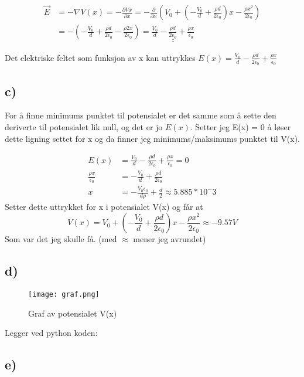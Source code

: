 \documentclass[a4paper,12pt,norsk]{article}
\begin{document}
\begin{align*}
\vec{E} &= - \nabla V(x) = -\frac{\partial Vx}{\partial x} = -\frac{\partial}{\partial x} \left(V_0 + \left( -\frac{V_0}{d} + \frac{\rho d}{2\epsilon_0} \right)x - \frac{\rho x^2}{2\epsilon_0}\right) \\
& = -\left(-\frac{V_0}{d} + \frac{\rho d}{2\epsilon_0} - \frac{\rho 2x}{2\epsilon_0}\right) 
=\underline{\underline{ \frac{V_0}{d} - \frac{\rho d}{2\epsilon_0} + \frac{\rho x}{\epsilon_0}}}
\end{align*}

Det elektriske feltet som funksjon av x kan uttrykkes $E(x) =  \frac{V_0}{d} - \frac{\rho d}{2\epsilon_0} + \frac{\rho x}{\epsilon_0}$

\subsection{c)}

For å finne minimums punktet til potensialet er det samme som å sette den deriverte til potensialet lik null, og det er jo $E(x)$. Setter jeg E(x) = 0 å løser dette ligning settet for x og da finner jeg minimums/maksimums punktet til V(x).

\begin{align*}
E(x) &=  \frac{V_0}{d} - \frac{\rho d}{2\epsilon_0} + \frac{\rho x}{\epsilon_0} = 0\\
\frac{\rho x}{\epsilon_0} &= -\frac{V_0}{d} + \frac{\rho d}{2\epsilon_0} \\
x &= -\frac{V_0\epsilon_0}{d\rho} + \frac{d}{2} \approx 5.885*10^-3
\end{align*}
Setter dette uttrykket for x i potensialet V(x) og får at $$V(x) = V_0 + \left( -\frac{V_0}{d} + \frac{\rho d}{2\epsilon_0} \right)x - \frac{\rho x^2}{2\epsilon_0} \approx -9.57 V$$ 
Som var det jeg skulle få. (med $\approx$ mener jeg avrundet) 

\subsection{d)}
\begin{figure}[h!]
\texttt{[image: graf.png]} 
\caption{Graf av potensialet V(x)}
\label{7}
\end{figure}
Legger ved python koden:


\subsection{e)}
\end{document}

